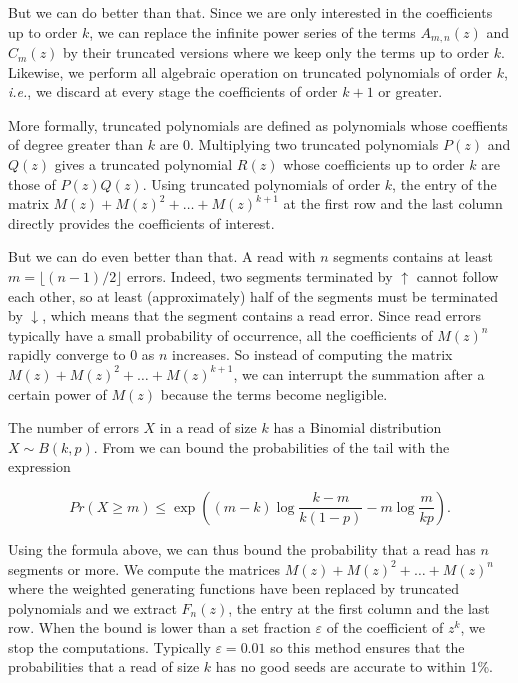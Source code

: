\documentclass{article}
\begin{document}
But we can do better than that. Since we are only interested in the
coefficients up to order $k$, we can replace the infinite power series
of the terms $A_{m,n}(z)$ and $C_m(z)$ by their truncated versions where
we keep only the terms up to order $k$. Likewise, we perform all
algebraic operation on truncated polynomials of order $k$, \textit{i.e.},
we discard at every stage the coefficients of order $k+1$ or greater.

More formally, truncated polynomials are defined as polynomials whose
coeffients of degree greater than $k$ are 0. Multiplying two truncated
polynomials $P(z)$ and $Q(z)$ gives a truncated polynomial $R(z)$ whose
coefficients up to order $k$ are those of $P(z)Q(z)$. Using truncated
polynomials of order $k$, the entry of the matrix $M(z) + M(z)^2 + \ldots
+ M(z)^{k+1}$ at the first row and the last column directly provides the
coefficients of interest.

But we can do even better than that. A read with $n$ segments contains at
least $m=\lfloor{(n-1)/2}\rfloor$ errors. Indeed, two segments terminated
by $\uparrow$ cannot follow each other, so at least (approximately) half
of the segments must be terminated by $\downarrow$, which means that the
segment contains a read error. Since read errors typically have a small
probability of occurrence, all the coefficients of $M(z)^n$ rapidly
converge to $0$ as $n$ increases. So instead of computing the matrix $M(z)
+ M(z)^2 + \ldots + M(z)^{k+1}$, we can interrupt the summation after a
certain power of $M(z)$ because the terms become negligible.

The number of errors $X$ in a read of size $k$ has a Binomial
distribution $X \sim B(k,p)$. From\cite{arratia1989tutorial} we can bound
the probabilities of the tail with the expression

\begin{equation}
\label{eq:bound}
Pr(X \geq m) \leq \exp \left( (m-k)\log \frac{k-m}{k(1-p)} -m\log
\frac{m}{kp} \right).
\end{equation}

Using the formula above, we can thus bound the probability that a read has
$n$ segments or more. We compute the matrices $M(z) + M(z)^2 + \ldots
+M(z)^n$ where the weighted generating functions have been replaced by
truncated polynomials and we extract $F_n(z)$, the entry at the first
column and the last row. When the bound is lower than a set fraction
$\varepsilon$ of the coefficient of $z^k$, we stop the computations.
Typically $\varepsilon = 0.01$ so this method ensures that the
probabilities that a read of size $k$ has no good seeds are accurate to
within 1\%.
\end{document}

